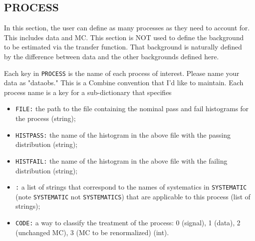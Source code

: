 \documentclass[letter]{article}
\begin{document}
	\subsection{PROCESS}
	In this section, the user can define as many processes as they need to account for. This includes data and MC. This section is NOT used to define the background to be estimated via the transfer function. That background is naturally defined by the difference between data and the other backgrounds defined here.

	Each key in \verb"PROCESS" is the name of each process of interest. Please name your data as "data\textunderscore obs." This is a Combine convention that I'd like to maintain. Each process name is a key for a sub-dictionary that specifies
	\begin{itemize}
		\item \verb"FILE:" the path to the file containing the nominal pass and fail histograms for the process (string);
		\item \verb"HISTPASS:" the name of the histogram in the above file with the passing distribution (string);
		\item \verb"HISTFAIL:" the name of the histogram in the above file with the failing distribution (string);
		\item \verb":" a list of strings that correspond to the names of systematics in \verb"SYSTEMATIC" (note \verb"SYSTEMATIC" not \verb"SYSTEMATICS") that are applicable to this process (list of strings);
		\item \verb"CODE:" a way to classify the treatment of the process: 0 (signal), 1 (data), 2 (unchanged MC), 3 (MC to be renormalized) (int).
	\end{itemize} 
\end{document}
